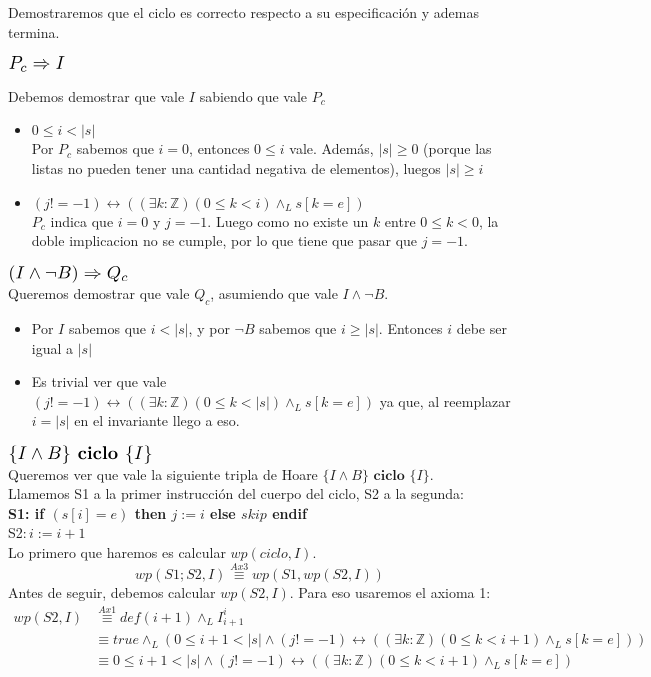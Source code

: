 \documentclass[a4paper]{article}
\begin{document}
Demostraremos que el ciclo es correcto respecto a su especificación y ademas termina.
	\begin{flushleft}$\scalebox{1.3}{$P_c\Rightarrow I$}$\end{flushleft}
	Debemos demostrar que vale $I$ sabiendo que vale $P_c$ 
	\begin{itemize}
		\item $ 0\leq i< |s|$\smallskip \\
		Por $P_c$ sabemos que $i=0$, entonces $0\leq i $ vale. Además, $|s|\geq 0$ (porque las listas no pueden tener una cantidad 
		negativa de elementos), luegos $|s|\geq i$
		\item $ (j!=-1)\leftrightarrow ((\exists k:\mathbb{Z})(0\leq k<i)\wedge_L s[k=e])$\smallskip \\
		$P_c$ indica que $i=0$ y $j=-1$. Luego como no existe un $k$ entre $0\leq k <0$, la doble implicacion no se cumple, por lo
		 que tiene que pasar que $j=-1$.
	\end{itemize}	 
	$\scalebox{1.3}{$(I\wedge \neg B)\Rightarrow Q_c$}$\smallskip \\
	Queremos demostrar que vale $Q_c$, asumiendo que vale  $I\wedge \neg B$.
	\begin{itemize}
	\item Por $I$ sabemos que $i< |s|$, y por $\neg B$ sabemos que $i\geq |s|$. Entonces $i$ debe ser igual a $|s|$
	\item Es trivial ver que vale $ (j!=-1)\leftrightarrow ((\exists k:\mathbb{Z})(0\leq k<|s|)\wedge_L s[k=e])$ ya que, al reemplazar
	 $i=|s|$ en el invariante llego a eso.
	\end{itemize}
	$\scalebox{1.3}{$\{I\wedge B\} \textbf{ ciclo } \{I\}$}$\medskip \\
	Queremos ver que vale la siguiente tripla de Hoare $\{I\wedge B\} \textbf{ ciclo } \{I\}$.\\
	Llamemos S1 a la primer instrucción del cuerpo del ciclo, S2 a la segunda:\\
	\textbf{S1: if $(s[i]=e)$ then $j:=i$ else $skip$ endif}\\
	S2$: i:=i+1$\\
	Lo primero que haremos es calcular $wp(ciclo,I)$.
	\begin{equation}wp(S1;S2,I)\stackrel{Ax3}{\equiv}wp(S1,wp(S2,I))\end{equation}
	Antes de seguir, debemos calcular $wp(S2,I)$. Para eso usaremos el axioma 1:
	\begin{align*}
	wp(S2,I)&\stackrel{Ax1}{\equiv}def(i+1)\wedge_L I_{i+1}^{i}\\
		&\equiv true\wedge_L (0\leq i+1<|s|\wedge (j!=-1)\leftrightarrow ((\exists k:\mathbb{Z})(0\leq k<i+1)\wedge_L s[k=e]))\\
		&\equiv 0\leq i+1<|s|\wedge (j!=-1)\leftrightarrow ((\exists k:\mathbb{Z})(0\leq k<i+1)\wedge_L s[k=e])
	\end{align*}
\end{document}
